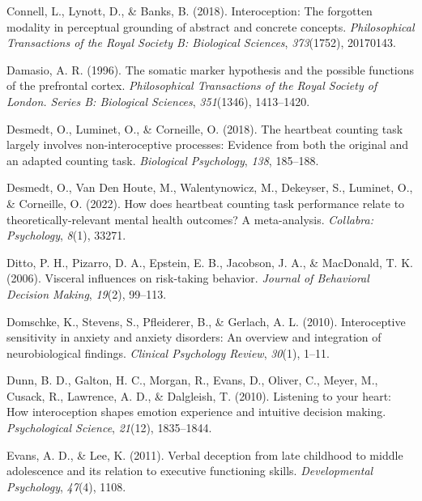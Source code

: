 \documentclass[
  man,floatsintext]{apa6}
\newlength{\cslhangindent}
\newlength{\cslentryspacingunit} %
\newenvironment{CSLReferences}[2] %
 {%
  \setlength{\parindent}{0pt}
  \ifodd #1
  \let\oldpar\par
  \def\par{\hangindent=\cslhangindent\oldpar}
  \fi
  \setlength{\parskip}{#2\cslentryspacingunit}
 }%
 {}
\begin{document}
\begin{CSLReferences}{1}{0}
\leavevmode{}%
Connell, L., Lynott, D., \& Banks, B. (2018). Interoception: The forgotten modality in perceptual grounding of abstract and concrete concepts. \emph{Philosophical Transactions of the Royal Society B: Biological Sciences}, \emph{373}(1752), 20170143.

\leavevmode{}%
Damasio, A. R. (1996). The somatic marker hypothesis and the possible functions of the prefrontal cortex. \emph{Philosophical Transactions of the Royal Society of London. Series B: Biological Sciences}, \emph{351}(1346), 1413--1420.

\leavevmode{}%
Desmedt, O., Luminet, O., \& Corneille, O. (2018). The heartbeat counting task largely involves non-interoceptive processes: Evidence from both the original and an adapted counting task. \emph{Biological Psychology}, \emph{138}, 185--188.

\leavevmode{}%
Desmedt, O., Van Den Houte, M., Walentynowicz, M., Dekeyser, S., Luminet, O., \& Corneille, O. (2022). How does heartbeat counting task performance relate to theoretically-relevant mental health outcomes? A meta-analysis. \emph{Collabra: Psychology}, \emph{8}(1), 33271.

\leavevmode{}%
Ditto, P. H., Pizarro, D. A., Epstein, E. B., Jacobson, J. A., \& MacDonald, T. K. (2006). Visceral influences on risk-taking behavior. \emph{Journal of Behavioral Decision Making}, \emph{19}(2), 99--113.

\leavevmode{}%
Domschke, K., Stevens, S., Pfleiderer, B., \& Gerlach, A. L. (2010). Interoceptive sensitivity in anxiety and anxiety disorders: An overview and integration of neurobiological findings. \emph{Clinical Psychology Review}, \emph{30}(1), 1--11.

\leavevmode{}%
Dunn, B. D., Galton, H. C., Morgan, R., Evans, D., Oliver, C., Meyer, M., Cusack, R., Lawrence, A. D., \& Dalgleish, T. (2010). Listening to your heart: How interoception shapes emotion experience and intuitive decision making. \emph{Psychological Science}, \emph{21}(12), 1835--1844.

\leavevmode{}%
Evans, A. D., \& Lee, K. (2011). Verbal deception from late childhood to middle adolescence and its relation to executive functioning skills. \emph{Developmental Psychology}, \emph{47}(4), 1108.


\end{CSLReferences}
\end{document}
